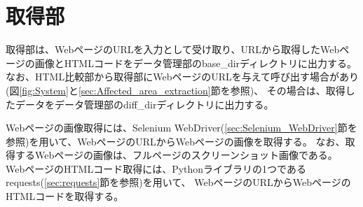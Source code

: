 

\section{取得部}\label{sec:Web_data_get_section}
取得部は、WebページのURLを入力として受け取り、URLから取得したWebページの画像とHTMLコードをデータ管理部のbase\_dirディレクトリに出力する。
なお、HTML比較部から取得部にWebページのURLを与えて呼び出す場合があり(図\ref{fig:System}と\ref{sec:Affected_area_extraction}節を参照)、
その場合は、取得したデータをデータ管理部のdiff\_dirディレクトリに出力する。
\par
Webページの画像取得には、Selenium WebDriver(\ref{sec:Selenium_WebDriver}節を参照)を用いて、WebページのURLからWebページの画像を取得する。
なお、取得するWebページの画像は、フルページのスクリーンショット画像である。
WebページのHTMLコード取得には、Pythonライブラリの1つであるrequests(\ref{sec:requests}節を参照)を用いて、
WebページのURLからWebページのHTMLコードを取得する。

